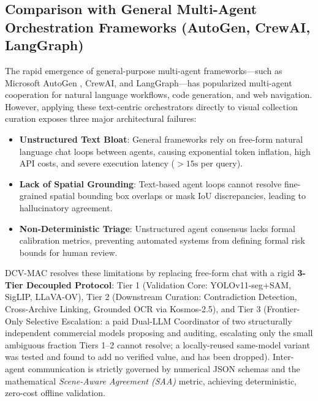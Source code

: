 \documentclass[12pt,a4paper]{report}
\begin{document}
\subsection{Comparison with General Multi-Agent Orchestration Frameworks (AutoGen, CrewAI, LangGraph)}
The rapid emergence of general-purpose multi-agent frameworks---such as Microsoft AutoGen \cite{autogen2024}, CrewAI, and LangGraph---has popularized multi-agent cooperation for natural language workflows, code generation, and web navigation. However, applying these text-centric orchestrators directly to visual collection curation exposes three major architectural failures:
\begin{itemize}
    \item \textbf{Unstructured Text Bloat}: General frameworks rely on free-form natural language chat loops between agents, causing exponential token inflation, high API costs, and severe execution latency ($>15\text{s}$ per query).
    \item \textbf{Lack of Spatial Grounding}: Text-based agent loops cannot resolve fine-grained spatial bounding box overlaps or mask IoU discrepancies, leading to hallucinatory agreement.
    \item \textbf{Non-Deterministic Triage}: Unstructured agent consensus lacks formal calibration metrics, preventing automated systems from defining formal risk bounds for human review.
\end{itemize}
DCV-MAC resolves these limitations by replacing free-form chat with a rigid \textbf{3-Tier Decoupled Protocol}: Tier 1 (Validation Core: YOLOv11-seg+SAM, SigLIP, LLaVA-OV), Tier 2 (Downstream Curation: Contradiction Detection, Cross-Archive Linking, Grounded OCR via Kosmos-2.5), and Tier 3 (Frontier-Only Selective Escalation: a paid Dual-LLM Coordinator of two structurally independent commercial models proposing and auditing, escalating only the small ambiguous fraction Tiers 1--2 cannot resolve; a locally-reused same-model variant was tested and found to add no verified value, and has been dropped). Inter-agent communication is strictly governed by numerical JSON schemas and the mathematical \textit{Scene-Aware Agreement (SAA)} metric, achieving deterministic, zero-cost offline validation.
\end{document}
